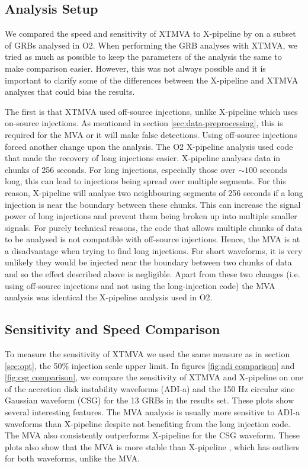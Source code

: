 \documentclass[11pt]{cuthesis}
\newcommand{\xp}{X-pipeline }
\begin{document}
\subsection{Analysis Setup}
We compared the speed and sensitivity of XTMVA to \xp by on a subset of GRBs analysed in O2. When performing the GRB analyses with XTMVA, we tried as much as possible to keep the parameters of the analysis the same to make comparison easier. However, this was not always possible and it is important to clarify some of the differences between the \xp and XTMVA analyses that could bias the results. 

The first is that XTMVA used off-source injections, unlike \xp which uses on-source injections. As mentioned in section \ref{sec:data-preprocessing}, this is required for the MVA or it will make false detections. Using off-source injections forced another change upon the analysis. The O2 \xp analysis used code that made the recovery of long injections easier. \xp analyses data in chunks of 256 seconds. For long injections, especially those over $\sim100$ seconds long, this can lead to injections being spread over multiple segments. For this reason, \xp will analyse two neighbouring segments of 256 seconds if a long injection is near the boundary between these chunks. This can increase the signal power of long injections and prevent them being broken up into multiple smaller signals. For purely technical reasons, the code that allows multiple chunks of data to be analysed is not compatible with off-source injections. Hence, the MVA is at a disadvantage when trying to find long injections. For short waveforms, it is very unlikely they would be injected near the boundary between two chunks of data and so the effect described above is negligible. Apart from these two changes (i.e. using off-source injections and not using the long-injection code) the MVA analysis was identical the \xp analysis used in O2. 

\subsection{Sensitivity and Speed Comparison}
To measure the sensitivity of XTMVA we used the same measure as in section \ref{sec:opt}, the 50\% injection scale upper limit. In figures \ref{fig:adi comparison} and \ref{fig:csg comparison}, we compare the sensitivity of XTMVA and \xp on one of the accretion disk instability waveforms (ADI-a) and the 150 Hz circular sine Gaussian waveform (CSG) for the 13 GRBs in the results set. These plots show several interesting features. The MVA analysis is usually more sensitive to ADI-a waveforms than \xp despite not benefiting from the long injection code. The MVA also consistently outperforms \xp for the CSG waveform. These plots also show that the MVA is more stable than \xp, which has outliers for both waveforms, unlike the MVA.
\end{document}
